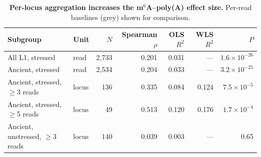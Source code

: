 \documentclass[11pt]{article}
\newcommand{\msix}{m$^6$A}
\begin{document}
\begin{table}[htbp]
\centering
\caption{\textbf{Per-locus aggregation increases the \msix{}--poly(A) effect size.} Per-read baselines (grey) shown for comparison.}
\label{tab:s4}
\begin{tabular}{llrrrrr}
\toprule
Subgroup & Unit & $N$ & Spearman $\rho$ & OLS $R^2$ & WLS $R^2$ & $P$ \\
\midrule
\rowcolor{gray!15} All L1, stressed & read & 2{,}733 & 0.201 & 0.031 & --- & $1.6\times10^{-26}$ \\
\rowcolor{gray!15} Ancient, stressed & read & 2{,}534 & 0.204 & 0.033 & --- & $3.2\times10^{-25}$ \\
\addlinespace
Ancient, stressed, $\geq$3 reads & locus & 136 & 0.335 & 0.084 & 0.124 & $7.5\times10^{-5}$ \\
Ancient, stressed, $\geq$5 reads & locus & 49 & 0.513 & 0.120 & 0.176 & $1.7\times10^{-4}$ \\
\addlinespace
Ancient, unstressed, $\geq$3 reads & locus & 140 & 0.039 & 0.003 & --- & 0.65 \\
\bottomrule
\end{tabular}
\end{table}


\end{document}
